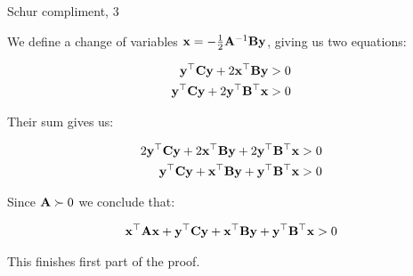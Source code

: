 \documentclass{beamer}
\begin{document}
\begin{frame}{Schur compliment, 3}
	\begin{flushleft}
		
		We define a change of variables $\mathbf{x} = - \frac{1}{2} \mathbf{A}^{-1}\mathbf{B} \mathbf{y}$, giving us two equations:
		
		\begin{align}
			\mathbf{y}^\top\mathbf{C}\mathbf{y}  + 2 \mathbf{x}^\top\mathbf{B} \mathbf{y} > 0 \\
			\mathbf{y}^\top\mathbf{C}\mathbf{y}  + 2 \mathbf{y}^\top\mathbf{B}^\top \mathbf{x} > 0 
		\end{align}
		
		Their sum gives us: 
		
		\begin{align}
			2 \mathbf{y}^\top\mathbf{C}\mathbf{y}  + 2 \mathbf{x}^\top\mathbf{B} \mathbf{y} + 2 \mathbf{y}^\top\mathbf{B}^\top \mathbf{x} > 0 \\
			\mathbf{y}^\top\mathbf{C}\mathbf{y}  + \mathbf{x}^\top\mathbf{B} \mathbf{y} + \mathbf{y}^\top\mathbf{B}^\top \mathbf{x} > 0
		\end{align}
		
		Since $\mathbf{A} \succ 0$ we conclude that:
		
		\begin{align}
			 \mathbf{x}^\top\mathbf{A}  \mathbf{x} +
			\mathbf{y}^\top\mathbf{C}\mathbf{y}  + \mathbf{x}^\top\mathbf{B} \mathbf{y} + \mathbf{y}^\top\mathbf{B}^\top \mathbf{x} > 0
		\end{align}
		
		This finishes first part of the proof.
		
	\end{flushleft}
\end{frame}
\end{document}
